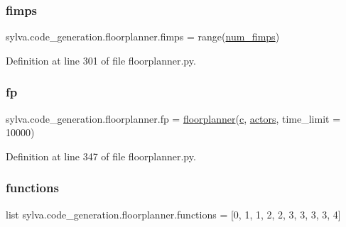 \subsubsection{\texorpdfstring{fimps}{fimps}}
{\footnotesize\ttfamily sylva.\+code\+\_\+generation.\+floorplanner.\+fimps = range(\hyperlink{namespacesylva_1_1code__generation_1_1floorplanner_aa3c18a3eb7fa3c7977cf8602c6570793}{num\+\_\+fimps})}



Definition at line 301 of file floorplanner.\+py.

\mbox{\label{namespacesylva_1_1code__generation_1_1floorplanner_aef6ab7f5eecb6c140149e1ea30161d62}} 
\subsubsection{\texorpdfstring{fp}{fp}}
{\footnotesize\ttfamily sylva.\+code\+\_\+generation.\+floorplanner.\+fp = \hyperlink{classsylva_1_1code__generation_1_1floorplanner_1_1floorplanner}{floorplanner}(\hyperlink{namespacesylva_1_1code__generation_1_1floorplanner_a5ed98e48cee4fdb98cc0772655281931}{c}, \hyperlink{namespacesylva_1_1code__generation_1_1floorplanner_a0a7a26c9bd92be126f3b70c232ba81cd}{actors}, time\+\_\+limit = 10000)}



Definition at line 347 of file floorplanner.\+py.

\mbox{\label{namespacesylva_1_1code__generation_1_1floorplanner_ad22d3fbef637b5348ba1001937e142d7}} 
\subsubsection{\texorpdfstring{functions}{functions}}
{\footnotesize\ttfamily list sylva.\+code\+\_\+generation.\+floorplanner.\+functions = \mbox{[}0, 1, 1, 2, 2, 3, 3, 3, 3, 4\mbox{]}}



